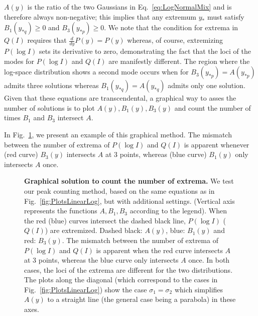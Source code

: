 \documentclass[11pt,a4paper,draft]{article}
\begin{document}
\smallskip
$A(y)$ is the ratio of the two Gaussians in Eq.~\ref{eq:LogNormalMix} and is therefore always non-negative; this implies that any extremum $y_*$ must satisfy $B_1(y_{*q})\ge 0$ and $B_3(y_{*p})\ge 0$. We note that the condition for extrema in $Q(I)$ requires that $\frac{d}{dy}P(y)=P(y)$ whereas, of course, extremizing $P(\log I)$ sets its derivative to zero, demonstrating the fact that the loci of the modes for $P(\log I)$ and $Q(I)$ are manifestly different. The region where the log-space distribution shows a second mode occurs when for $B_3(y_{*p})=A(y_{*p})$ admits three solutions whereas $B_1(y_{*q})=A(y_{*q})$ admits only one solution. Given that these equations are transcendental, a graphical way to asses the number of solutions is to plot $A(y),B_1(y),B_3(y)$ and count the number of times $B_1$ and $B_3$ intersect $A$.\smallskip

In Fig.~\ref{fig:ExtremaSolutions}, we present an example of this graphical method. The mismatch between the number of extrema of $P(\log I)$ and $Q(I)$ is apparent whenever (red curve) $B_3(y)$ intersects $A$ at 3 points, whereas (blue curve) $B_1(y)$ only intersects $A$ once. \smallskip

\begin{figure}[!ht]
 \centering
  \caption{\textbf{Graphical solution to count the number of extrema.} We test our peak counting method, based on the same equations as in Fig.~\ref{fig:PlotsLinearLog}, but with additional settings. (Vertical axis represents the functions $A, B_1,B_3$ according to the legend). When the red (blue) curves intersect the dashed black line, $P(\log I)$ ($Q(I)$) are extremized. Dashed black: $A(y)$, blue: $B_1(y)$ and red: $B_3(y)$. The mismatch between the number of extrema of $P(\log I)$ and $Q(I)$ is apparent when the red curve intersects $A$ at 3 points, whereas the blue curve only intersects $A$ once. In both cases, the loci of the extrema are different for the two distributions. The plots along the diagonal (which correspond to the cases in Fig.~\ref{fig:PlotsLinearLog}) show the case $\sigma_1=\sigma_2$ which simplifies $A(y)$ to a straight line (the general case being a parabola) in these axes.}
  \label{fig:ExtremaSolutions}
\end{figure}
\end{document}
